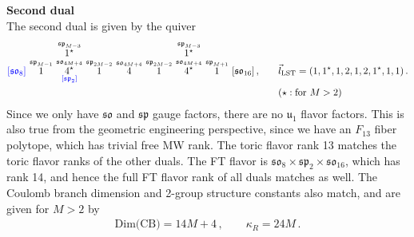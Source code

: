 \documentclass[11pt]{article}
\numberwithin{equation}{section}
\newcommand\myoverset[2]{\overset{\textstyle #1\mathstrut}{#2}}
\newcommand{\fu}{\mathfrak{u}}
\newcommand{\LST}{\text{LST}\xspace}
\begin{document}
\textbf{Second dual}\\
The second dual is given by the quiver
\begin{align}
\begin{split}
 \textcolor{blue}{\lbrack \mathfrak{so}_{8}\rbrack }    \, \,   
{\overset{\mathfrak{sp}_{M-1}}{1}}   \, \,  
\myoverset{\overset{\mathfrak{sp}_{M-3}}{1^{\star}}}
{\underset{\textcolor{blue}{\left[\mathfrak{sp}_{2}\right]}}{\overset{\mathfrak{so}_{4M+4}}{4^{\star}}}} \, \, 
{\overset{\mathfrak{sp}_{2M-2}}{1}}  \, \,
{\overset{\mathfrak{so}_{4M+4}}{4}} \, \, 
{\overset{\mathfrak{sp}_{2M-2}}{1}} \, \, 
\myoverset{\overset{\mathfrak{sp}_{M-3}}{1^{\star}}}
{\overset{\mathfrak{so}_{4M+4}}{4^{\star}}} \, \, 
{\overset{\mathfrak{sp}_{M+1}}{1}} \, \,
\lbrack \mathfrak{so}_{16} \rbrack   \, ,   \qquad 
&\vec{l}_{\LST}=(1, 1^\star,1, 2,1,2,1^\star,1,1)\,. \\
&(\star : \text{for } M>2)
\end{split}
\end{align}
Since we only have $\mathfrak{so}$ and $\mathfrak{sp}$ gauge factors, there are no $\fu_1$ flavor factors. This is also true from the geometric engineering perspective, since we have an $F_{13}$ fiber polytope, which has trivial free MW rank. The toric flavor rank 13 matches the toric flavor ranks of the other duals. The FT flavor is $\mathfrak{so}_{8} \times \mathfrak{sp}_{2} \times \mathfrak{so}_{16}$, which has rank 14, and hence the full FT flavor rank of all duals matches as well. The Coulomb branch dimension and 2-group structure constants also match, and are given for $M>2$ by
\begin{align}
\text{Dim(CB)}=14M +4 \, , \qquad \kappa_{R}=24M\, .
\end{align} 
\end{document}
